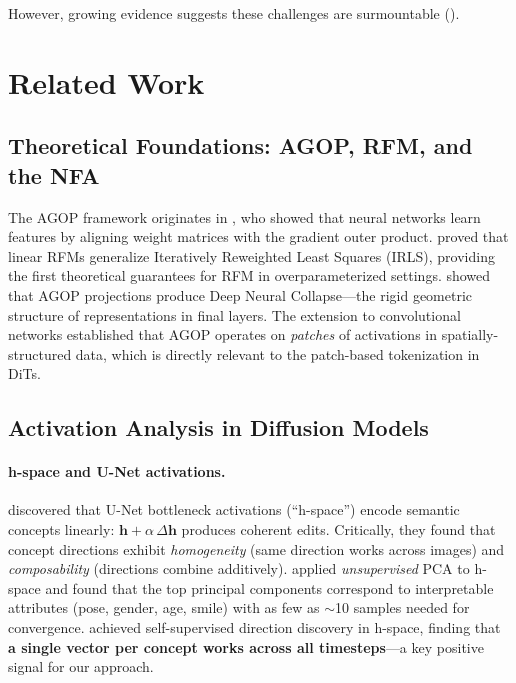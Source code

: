 \documentclass[11pt]{article}
\begin{document}
However, growing evidence suggests these challenges are surmountable ().

\section{Related Work}
\label{sec:related}

\subsection{Theoretical Foundations: AGOP, RFM, and the NFA}

The AGOP framework originates in \citet{radhakrishnan2024mechanism}, who showed that neural networks learn features by aligning weight matrices with the gradient outer product.
\citet{radhakrishnan2025linear} proved that linear RFMs generalize Iteratively Reweighted Least Squares (IRLS), providing the first theoretical guarantees for RFM in overparameterized settings.
\citet{beaglehole2024neural} showed that AGOP projections produce Deep Neural Collapse---the rigid geometric structure of representations in final layers.
The extension to convolutional networks \citep{beaglehole2023cnn} established that AGOP operates on \emph{patches} of activations in spatially-structured data, which is directly relevant to the patch-based tokenization in DiTs.

\subsection{Activation Analysis in Diffusion Models}
\label{sec:evidence}

\paragraph{h-space and U-Net activations.}
\citet{kwon2023diffusion} discovered that U-Net bottleneck activations (``h-space'') encode semantic concepts linearly: $\mathbf{h} + \alpha\,\Delta\mathbf{h}$ produces coherent edits.
Critically, they found that concept directions exhibit \emph{homogeneity} (same direction works across images) and \emph{composability} (directions combine additively).
\citet{haas2023discovering} applied \emph{unsupervised} PCA to h-space and found that the top principal components correspond to interpretable attributes (pose, gender, age, smile) with as few as $\sim$10 samples needed for convergence.
\citet{li2024selfdiscovering} achieved self-supervised direction discovery in h-space, finding that \textbf{a single vector per concept works across all timesteps}---a key positive signal for our approach.
\end{document}
